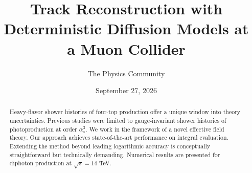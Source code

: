 \documentclass[11pt]{article}
\title{Track Reconstruction with Deterministic Diffusion Models at a Muon Collider}
\author{The Physics Community}
\date{September 27, 2026}
\numberwithin{equation}{section}
\theoremstyle{definition}
\theoremstyle{remark}
\begin{document}
\maketitle
\begin{abstract}
Heavy-flavor shower histories of four-top production offer a unique
window into theory uncertainties. Previous studies were limited to
gauge-invariant shower histories of photoproduction at order
$\alpha_s^3$. We work in the framework of a novel effective field
theory. Our approach achieves state-of-the-art performance on integral
evaluation. Extending the method beyond leading logarithmic accuracy is
conceptually straightforward but technically demanding. Numerical
results are presented for diphoton production at $\sqrt{s} = 14$ TeV.
\end{abstract}
\tableofcontents





\nocite{*}


\end{document}
